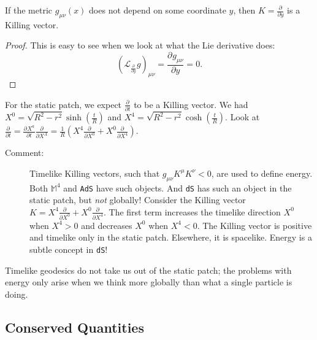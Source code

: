\begin{claim}
  If the metric $g_{\mu\nu}(x)$ does not depend on some coordinate $y$, then $K = \frac{\partial^{} }{\partial y}$ is a Killing vector.
\end{claim}
\begin{proof}
  This is easy to see when we look at what the Lie derivative does:
  \begin{equation}
    (\mathcal{L}_{\frac{\partial^{} }{\partial y}} g)_{\mu\nu} = \frac{\partial^{} g_{\mu\nu}}{\partial y} = 0.
  \end{equation}
\end{proof}
\begin{example}
  For the static patch, we expect $\frac{\partial^{} }{\partial t}$ to be a Killing vector.
  We had $X^0 = \sqrt{R^2 - r^2} \sinh( \frac{t}{R})$ and $X^4 = \sqrt{R^2 - r^2} \cosh ( \frac{t}{R})$.
  Look at $\frac{\partial^{}}{\partial t} = \frac{\partial^{} X^{a}}{\partial t} \frac{\partial^{} }{\partial X^{A}} = \frac{1}{R}(X^4 \frac{\partial^{} }{\partial X^0} + X^0 \frac{\partial^{} }{\partial X^4})$.
\end{example}
\begin{description}
  \item[Comment:] Timelike Killing vectors, such that $g_{\mu\nu} K^{\mu} K^{\nu} < 0$, are used to define energy.
    Both $\mathbb{M}^4$ and \texttt{AdS} have such objects. And \texttt{dS} has such an object in the static patch, but \emph{not} globally!
    Consider the Killing vector $K = X^4 \frac{\partial^{} }{\partial X^0} + X^0 \frac{\partial^{} }{\partial X^4}$. The first term increases the timelike direction $X^0$ when $X^4 > 0$ and decreases $X^0$ when $X^4 <0$.
    The Killing vector is positive and timelike only in the static patch.
    Elsewhere, it is spacelike. Energy is a subtle concept in \texttt{dS}!
\end{description}
\begin{leftbar}
  \begin{remark}
    Timelike geodesics do not take us out of the static patch; the problems with energy only arise when we think more globally than what a single particle is doing.
  \end{remark}
\end{leftbar}

\subsection{Conserved Quantities}%
\label{sub:conserved_quantities}

